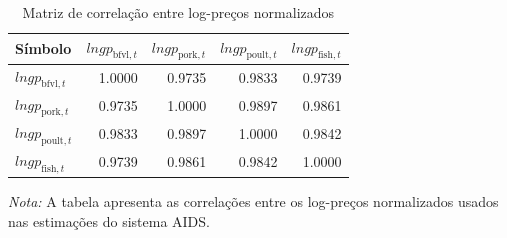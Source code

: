 
\begin{table}[H]
\centering
\caption{Matriz de correlação entre log-preços normalizados}
\label{tab:correlacao-precos}
\small
\begin{tabular}{@{}lrrrr@{}}
\toprule
Símbolo 
& \(lngp_{\text{bfvl},t}\) 
& \(lngp_{\text{pork},t}\) 
& \(lngp_{\text{poult},t}\) 
& \(lngp_{\text{fish},t}\) \\
\midrule
\(lngp_{\text{bfvl},t}\)  & 1.0000 & 0.9735 & 0.9833 & 0.9739 \\
\(lngp_{\text{pork},t}\)  & 0.9735 & 1.0000 & 0.9897 & 0.9861 \\
\(lngp_{\text{poult},t}\) & 0.9833 & 0.9897 & 1.0000 & 0.9842 \\
\(lngp_{\text{fish},t}\)  & 0.9739 & 0.9861 & 0.9842 & 1.0000 \\
\bottomrule
\end{tabular}

\par\vspace{0.35em}
\begin{minipage}{0.92\textwidth}
\footnotesize 
\textit{Nota:} A tabela apresenta as correlações entre os log-preços normalizados usados nas estimações do sistema AIDS.
\end{minipage}
\end{table}
